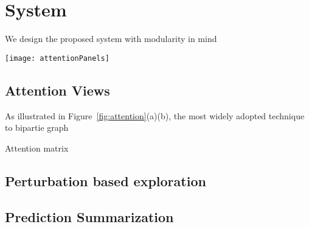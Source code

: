 \section{System}
We design the proposed system with modularity in mind


\begin{figure*}[t]
\centering
\vspace{-2mm}
 \texttt{[image: attentionPanels]}
  \vspace{-6mm}
 \caption{
Attention visualization. In the graph attention view (a), a bipartite graph encoding is adopted, in which the edge thickness corresponds to the attention value. In the matrix attention view (b), the entries of $i^{th}$ row represent the probabilities of words in hypotheses align to the $i^{th}$ word in the premise.
The user can alter the attention values via the pop-up interface illustrated in (c).
We overlay the dependency tree ($a_1$) grammar structure to highlight important words and allow simplification of complex sentence based on the dependency tree.
%
For highly asymmetric attention relationship, we utilized a zoomable hierarchical visual representation (d).
}
\label{fig:attention}
\end{figure*}

\subsection{Attention Views}
As illustrated in Figure~\ref{fig:attention}(a)(b), the most widely adopted technique to bipartie graph

Attention matrix


\subsection{Perturbation based exploration}
\label{sec:perturb}

\subsection{Prediction Summarization}



